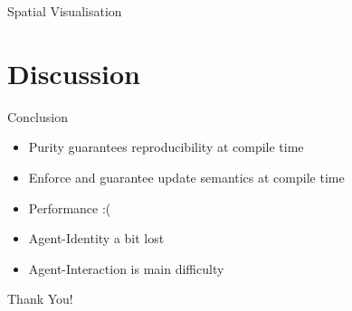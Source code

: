 \documentclass{beamer}
\begin{document}
\begin{frame}{Spatial Visualisation}
\end{frame}

\section{Discussion}
%  
%  
%  

\begin{frame}{Conclusion}
  \begin{itemize}
    \item Purity guarantees reproducibility at compile time
    \item Enforce and guarantee update semantics at compile time
    \item Performance :(
    \item Agent-Identity a bit lost
    \item Agent-Interaction is main difficulty
  \end{itemize}
\end{frame}

\begin{frame}{}
  \begin{center}
  Thank You!
  \end{center}
\end{frame}
\end{document}
